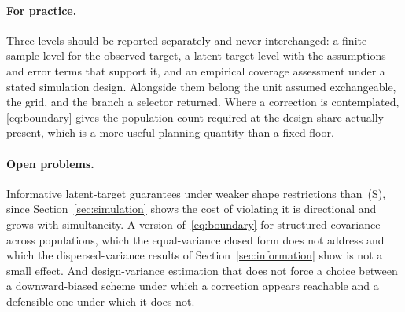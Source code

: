 \paragraph{For practice.} Three levels should be reported separately and never
interchanged: a finite-sample level for the observed target, a latent-target
level with the assumptions and error terms that support it, and an empirical
coverage assessment under a stated simulation design. Alongside them belong the
unit assumed exchangeable, the grid, and the branch a selector returned. Where
a correction is contemplated, \eqref{eq:boundary} gives the population count
required at the design share actually present, which is a more useful planning
quantity than a fixed floor.

\paragraph{Open problems.} Informative latent-target guarantees under weaker
shape restrictions than~(S), since Section~\ref{sec:simulation} shows the cost
of violating it is directional and grows with simultaneity. A version of~\eqref{eq:boundary} for structured
covariance across populations, which the equal-variance closed form does not
address and which the dispersed-variance results of Section~\ref{sec:information}
show is not a small effect. And design-variance estimation that
does not force a choice between a downward-biased scheme under which a
correction appears reachable and a defensible one under which it does not.

